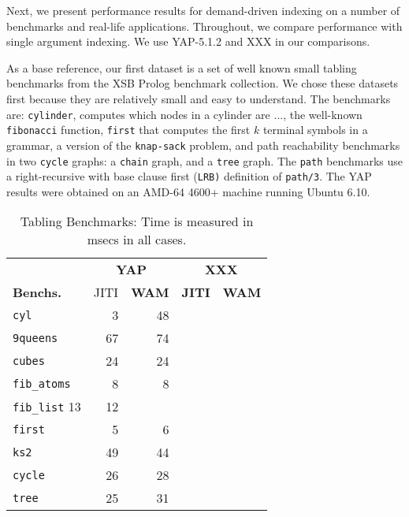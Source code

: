 \documentclass{llncs}
\begin{document}

Next, we present performance results for demand-driven indexing on a
number of benchmarks and real-life applications. Throughout, we
compare performance with single argument indexing. We use YAP-5.1.2
and XXX in our comparisons.

As a base reference, our first dataset is a set of well known small
tabling benchmarks from the XSB Prolog benchmark collection. We chose
these datasets first because they are relatively small and easy to
understand. The benchmarks are: \texttt{cylinder}, computes which
nodes in a cylinder are ..., the well-known \texttt{fibonacci}
function, \texttt{first} that computes the first $k$ terminal symbols
in a grammar, a version of the \texttt{knap-sack} problem, and path
reachability benchmarks in two \texttt{cycle} graphs: a \texttt{chain}
graph, and a \texttt{tree} graph. The \texttt{path} benchmarks use a
right-recursive with base clause first (\texttt{LRB)} definition of
\texttt{path/3}. The YAP results were obtained on an AMD-64 4600+
machine running Ubuntu 6.10.

\begin{table}[ht]
  \centering
  \begin {tabular}{|l|r|r||r|r|} \hline %
    &  \multicolumn{2}{|c|}{\bf YAP}  & \multicolumn{2}{||c|}{\bf XXX} \\
    {\bf Benchs.}  & JITI & \bf WAM   & \bf JITI  &  \bf WAM  \\
    \hline
    \texttt{cyl}      & 3    & 48 &  &\\
    \texttt{9queens}      & 67    & 74 &  &\\
    \texttt{cubes}    & 24    & 24  & &\\
    \texttt{fib\_atoms}    & 8    & 8  & &\\
    \texttt{fib\_list}     13      & 12    &  & &  \\
    \texttt{first}    & 5     & 6    &    & \\
    \texttt{ks2} &  49      & 44    & &    \\
    \hline 
    \texttt{cycle}              & 26        & 28      & &      \\
    \texttt{tree}              & 25        & 31      & &      \\
    \hline
\end{tabular}
\caption{Tabling Benchmarks: Time is measured in msecs in all cases.}
\label{tab:aleph}
\end{table}
\end{document}
